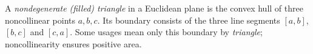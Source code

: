 
A \emph{nondegenerate (filled) triangle} in a Euclidean plane is the convex hull of three noncollinear points $a,b,c$. Its boundary consists of the three line segments $[a,b]$, $[b,c]$ and $[c,a]$. Some usages mean only this boundary by \emph{triangle}; noncollinearity ensures positive area.
